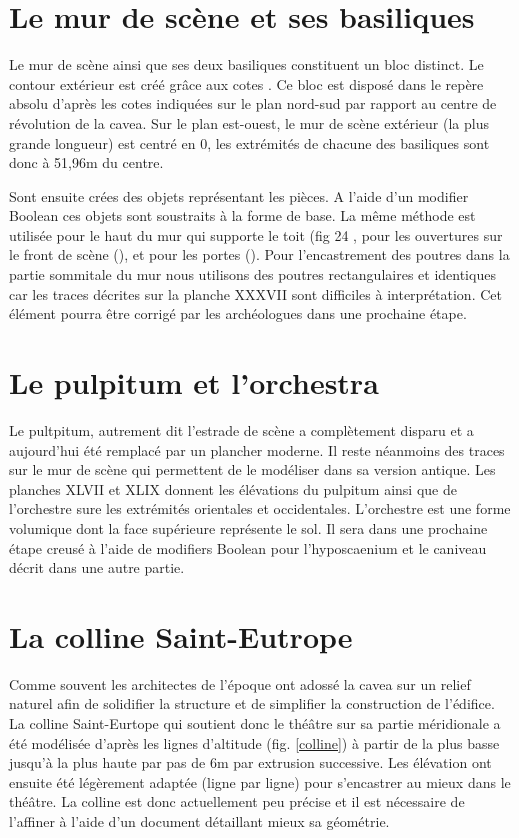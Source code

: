 		\section{Le mur de scène et ses basiliques}

Le mur de scène ainsi que ses deux basiliques constituent un bloc distinct. Le contour extérieur est créé grâce aux cotes \cite[Pl. XXI]{orangePl}. Ce bloc est disposé dans le repère absolu d'après les cotes indiquées sur le plan nord-sud par rapport au centre de révolution de la cavea. Sur le plan est-ouest, le mur de scène extérieur (la plus grande longueur) est centré en 0, les extrémités de chacune des basiliques sont donc à 51,96m du centre.

Sont ensuite crées des objets représentant les pièces. A l'aide d'un modifier Boolean ces objets sont soustraits à la forme de base. La même méthode est utilisée pour le haut du mur qui supporte le toit (fig 24 \cite{orangeTxt},  pour les ouvertures sur le front de scène (\cite[Pl. XXIX]{orangePl}), et pour les portes (\cite[Pl. XXI]{orangePl}). Pour l'encastrement des poutres dans la partie sommitale du mur nous utilisons des poutres rectangulaires et identiques car les traces décrites sur la planche XXXVII \cite{orangePl} sont difficiles à interprétation. Cet élément pourra être corrigé par les archéologues dans une prochaine étape.




		\section{Le pulpitum et l'orchestra} 

Le pultpitum, autrement dit l'estrade de scène a complètement disparu et a aujourd'hui été remplacé par un plancher moderne. Il reste néanmoins des traces sur le mur de scène qui permettent de le modéliser dans sa version antique. Les planches XLVII et XLIX \cite{orangePl} donnent les élévations du pulpitum ainsi que de l'orchestre sure les extrémités orientales et occidentales. L'orchestre est une forme volumique dont la face supérieure représente le sol. Il sera dans une prochaine étape creusé à l'aide de modifiers Boolean pour l'hyposcaenium et le caniveau décrit dans une autre partie.

		\section{La colline Saint-Eutrope} 
Comme souvent les architectes de l'époque ont adossé la cavea sur un relief naturel afin de solidifier la structure et de simplifier la construction de l'édifice. La colline Saint-Eurtope qui soutient donc le théâtre sur sa partie méridionale a été modélisée d'après les lignes d'altitude (fig. \ref{colline}) à partir de la plus basse jusqu'à la plus haute par pas de 6m par extrusion successive. Les élévation ont ensuite été légèrement adaptée (ligne par ligne) pour s'encastrer au mieux dans le théâtre. La colline est donc actuellement peu précise et il est nécessaire de l'affiner à l'aide d'un document détaillant mieux sa géométrie.

